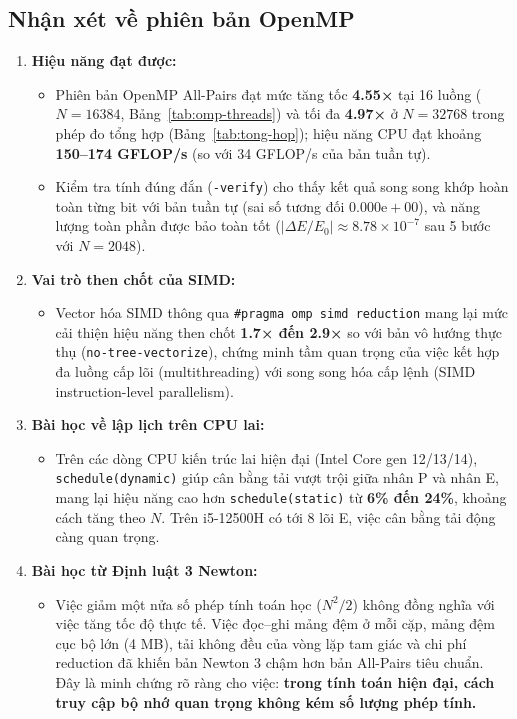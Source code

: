 \subsection{Nhận xét về phiên bản OpenMP}

\begin{enumerate}
\item \textbf{Hiệu năng đạt được:}
\begin{itemize}
\item Phiên bản OpenMP All-Pairs đạt mức tăng tốc \textbf{4.55×} tại 16 luồng ($N=16384$, Bảng~\ref{tab:omp-threads}) và tối đa \textbf{4.97×} ở $N=32768$ trong phép đo tổng hợp (Bảng~\ref{tab:tong-hop}); hiệu năng CPU đạt khoảng \textbf{150--174 GFLOP/s} (so với 34 GFLOP/s của bản tuần tự).
\item Kiểm tra tính đúng đắn (\texttt{-verify}) cho thấy kết quả song song khớp hoàn toàn từng bit với bản tuần tự (sai số tương đối $0.000\text{e}+00$), và năng lượng toàn phần được bảo toàn tốt ($|\Delta E / E_0| \approx 8.78 \times 10^{-7}$ sau 5 bước với $N=2048$).
\end{itemize}
\item \textbf{Vai trò then chốt của SIMD:}
\begin{itemize}
\item Vector hóa SIMD thông qua \texttt{\#pragma omp simd reduction} mang lại mức cải thiện hiệu năng then chốt \textbf{1.7× đến 2.9×} so với bản vô hướng thực thụ (\texttt{no-tree-vectorize}), chứng minh tầm quan trọng của việc kết hợp đa luồng cấp lõi (multithreading) với song song hóa cấp lệnh (SIMD instruction-level parallelism).
\end{itemize}
\item \textbf{Bài học về lập lịch trên CPU lai:}
\begin{itemize}
\item Trên các dòng CPU kiến trúc lai hiện đại (Intel Core gen 12/13/14), \texttt{schedule(dynamic)} giúp cân bằng tải vượt trội giữa nhân P và nhân E, mang lại hiệu năng cao hơn \texttt{schedule(static)} từ \textbf{6\% đến 24\%}, khoảng cách tăng theo $N$. Trên i5-12500H có tới 8 lõi E, việc cân bằng tải động càng quan trọng.
\end{itemize}
\item \textbf{Bài học từ Định luật 3 Newton:}
\begin{itemize}
\item Việc giảm một nửa số phép tính toán học ($N^2/2$) không đồng nghĩa với việc tăng tốc độ thực tế. Việc đọc--ghi mảng đệm ở mỗi cặp, mảng đệm cục bộ lớn (4 MB), tải không đều của vòng lặp tam giác và chi phí reduction đã khiến bản Newton 3 chậm hơn bản All-Pairs tiêu chuẩn. Đây là minh chứng rõ ràng cho việc: \textbf{trong tính toán hiện đại, cách truy cập bộ nhớ quan trọng không kém số lượng phép tính.}
\end{itemize}
\end{enumerate}

